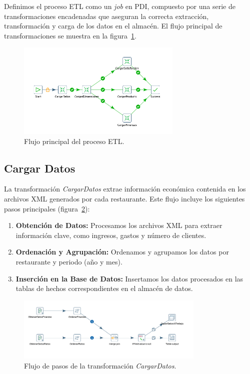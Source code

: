 \documentclass[11pt]{opticajnl}
\begin{document}
Definimos el proceso ETL como un \textit{job} en PDI, compuesto por una serie de transformaciones encadenadas que aseguran la correcta extracción, transformación y carga de los datos en el almacén. El flujo principal de transformaciones se muestra en la figura~\ref{fig:etl_principal}.

\begin{figure}[h]
    \centering
    \includegraphics[width=0.7\textwidth]{fotos/ETL.png}
    \caption{Flujo principal del proceso ETL.}
    \label{fig:etl_principal}
\end{figure}

\subsection{Cargar Datos}

La transformación \textit{CargarDatos} extrae información económica contenida en los archivos XML generados por cada restaurante. Este flujo incluye los siguientes pasos principales (figura~\ref{fig:etl_datos}):

\begin{enumerate}
    \item \textbf{Obtención de Datos:} Procesamos los archivos XML para extraer información clave, como ingresos, gastos y número de clientes.
    \item \textbf{Ordenación y Agrupación:} Ordenamos y agrupamos los datos por restaurante y periodo (año y mes).
    \item \textbf{Inserción en la Base de Datos:} Insertamos los datos procesados en las tablas de hechos correspondientes en el almacén de datos.
\end{enumerate}

\begin{figure}[h]
    \centering
    \includegraphics[width=0.8\textwidth]{fotos/CargarDatos.png}
    \caption{Flujo de pasos de la transformación \textit{CargarDatos}.}
    \label{fig:etl_datos}
\end{figure}
\end{document}
